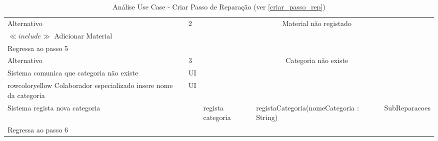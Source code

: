 \documentclass[../relatorio.tex]{subfiles}
\begin{document}
\begin{landscape}
\begin{table}[!h]
\begin{tabular}{|p{5cm}|p{1cm}|p{4cm}|p{6cm}|p{3cm}|}
                     & 
                     & 
                     & 
            \\
            \hline
            \rowcolor{green!30}
            Alternativo  & 2                                                 &  \multicolumn{3}{c}{Material não registado}\\
            \hline
            $\ll include \gg$ Adicionar Material
                     & 
                     & 
                     & 
                     & 
            \\
            \hline
            Regressa ao passo 5
                     & 
                     & 
                     & 
                     & 
            \\
            \hline
            \rowcolor{green!30}
            Alternativo  & 3                                                &  \multicolumn{3}{c}{Categoria não existe}\\
            \hline
            \rowcolor{yellow}
            Sistema comunica que categoria não existe 
                     & UI
                     & 
                     & 
                     & 
            \\
            \hline
            rowcolor{yellow}
            Colaborador especializado insere nome da categoria 
                     & UI
                     & 
                     & 
                     & 
            \\
            \hline
            Sistema regista nova categoria
                     & 
                     & regista categoria 
                     & registaCategoria(nomeCategoria : String)
                     & SubReparacoes
            \\
            \hline
            Regressa ao passo 6
                     & 
                     & 
                     & 
                     & 
            \\
            \hline
        \end{tabular}
        \caption{Análise Use Case - Criar Passo de Reparação (ver \ref{criar_passo_rep})}
    \end{table}
\end{landscape}
\end{document}
